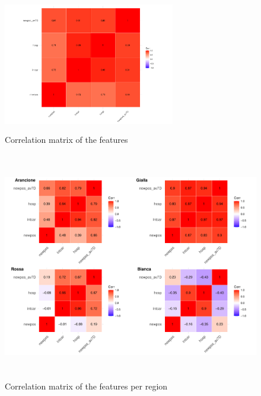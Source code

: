 \documentclass[12pt,a4paper]{article}
\theoremstyle{definition}
\theoremstyle{remark}
\begin{document}
\begin{figure}[htb!]
	\centering
	\includegraphics[width=75mm, height=60mm,scale=0.5]{corrmatrix.pdf}
	\caption{Correlation matrix of the features}
\end{figure}
\begin{figure}[htb!]
	\centering
	\includegraphics[width=130mm, height=100mm,scale=0.5]{corrmat2.pdf}
	\caption{Correlation matrix of the features per region}
\end{figure}
\end{document}
